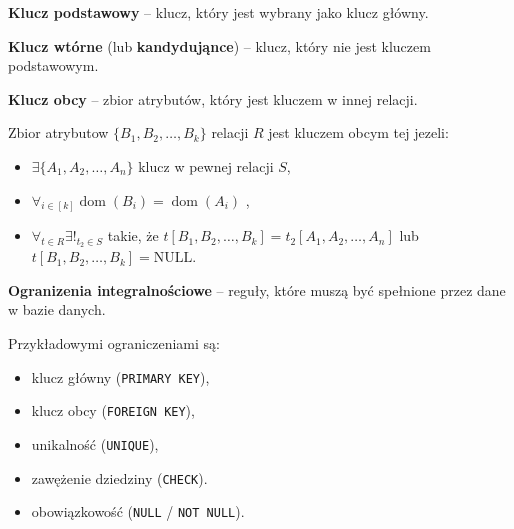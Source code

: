 \begin{definition}
    \textbf{Klucz podstawowy} -- klucz, który jest wybrany jako klucz główny.
\end{definition}

\begin{definition}
    \textbf{Klucz wtórne} (lub \textbf{kandydująnce}) -- klucz, który nie jest kluczem podstawowym.
\end{definition}

\begin{definition}
    \textbf{Klucz obcy} -- zbior atrybutów, który jest kluczem w innej relacji.
\end{definition}

Zbior atrybutow \( \{B_1, B_2, \ldots, B_k \} \) relacji \(R\) jest kluczem obcym tej jezeli:
\begin{itemize}
    \item \( \exists \{A_1, A_2, \ldots, A_n \} \) klucz w pewnej relacji \(S\),
    \item \( \forall_{i \in [k]}  \operatorname{dom}(B_i) = \operatorname{dom}(A_i) \) ,
    \item \( \forall_{t \in R} \exists!_{t_2 \in S} \) takie, że \( t[B_1, B_2, \ldots, B_k] = t_2[A_1, A_2, \ldots, A_n] \) lub \( t[B_1, B_2, \ldots, B_k] = \text{NULL} \).
\end{itemize}


\begin{definition}
    \textbf{Ogranizenia integralnościowe} -- reguły, które muszą być spełnione przez dane w bazie danych.
\end{definition}

Przykładowymi ograniczeniami są:
\begin{itemize}
    \item klucz główny (\texttt{PRIMARY KEY}),
    \item klucz obcy (\texttt{FOREIGN KEY}),
    \item unikalność (\texttt{UNIQUE}),
    \item zawężenie dziedziny (\texttt{CHECK}).
    \item obowiązkowość (\texttt{NULL} / \texttt{NOT NULL}).
\end{itemize}

